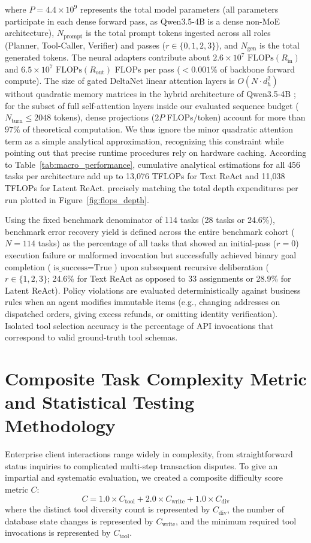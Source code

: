 \documentclass[a4paper, 12pt]{report}
\begin{document}
where $P = 4.4 \times 10^9$ represents the total model parameters (all parameters participate in each dense forward pass, as Qwen3.5-4B is a dense non-MoE architecture), $N_{\text{prompt}}$ is the total prompt tokens ingested across all roles (Planner, Tool-Caller, Verifier) and passes ($r \in \{0, 1, 2, 3\}$), and $N_{\text{gen}}$ is the total generated tokens. The neural adapters contribute about $2.6 \times 10^7$ $\text{FLOPs}(R_{\text{in}})$ and $6.5 \times 10^7$ $\text{FLOPs}(R_{\text{out}})$ FLOPs per pass ($< 0.001\%$ of backbone forward compute). The size of gated DeltaNet linear attention layers is $O(N \cdot d_h^2)$ without quadratic memory matrices in the hybrid architecture of Qwen3.5-4B \cite{qwen2026team}; for the subset of full self-attention layers inside our evaluated sequence budget ($N_{\text{turn}} \le 2048$ tokens), dense projections ($2P$ FLOPs/token) account for more than $97\%$ of theoretical computation. We thus ignore the minor quadratic attention term as a simple analytical approximation, recognizing this constraint while pointing out that precise runtime procedures rely on hardware caching. According to Table~\ref{tab:macro_performance}, cumulative analytical estimations for all 456 tasks per architecture add up to 13,076 TFLOPs for Text ReAct and 11,038 TFLOPs for Latent ReAct. precisely matching the total depth expenditures per run plotted in Figure~\ref{fig:flops_depth}.

Using the fixed benchmark denominator of 114 tasks (28 tasks or 24.6\%), benchmark error recovery yield is defined across the entire benchmark cohort ($N = 114$ tasks) as the percentage of all tasks that showed an initial-pass ($r=0$) execution failure or malformed invocation but successfully achieved binary goal completion ($\text{is\_success} = \text{True}$) upon subsequent recursive deliberation ($r \in \{1, 2, 3\}$; 24.6\% for Text ReAct as opposed to 33 assignments or 28.9\% for Latent ReAct). Policy violations are evaluated deterministically against business rules when an agent modifies immutable items (e.g., changing addresses on dispatched orders, giving excess refunds, or omitting identity verification). Isolated tool selection accuracy is the percentage of API invocations that correspond to valid ground-truth tool schemas.

\section{Composite Task Complexity Metric and Statistical Testing Methodology}
Enterprise client interactions range widely in complexity, from straightforward status inquiries to complicated multi-step transaction disputes. To give an impartial and systematic evaluation, we created a composite difficulty score metric $C$:
\begin{equation}
    C = 1.0 \times C_{\text{tool}} + 2.0 \times C_{\text{write}} + 1.0 \times C_{\text{div}}
\end{equation}
where the distinct tool diversity count is represented by $C_{\text{div}}$, the number of database state changes is represented by $C_{\text{write}}$, and the minimum required tool invocations is represented by $C_{\text{tool}}$.
\end{document}
